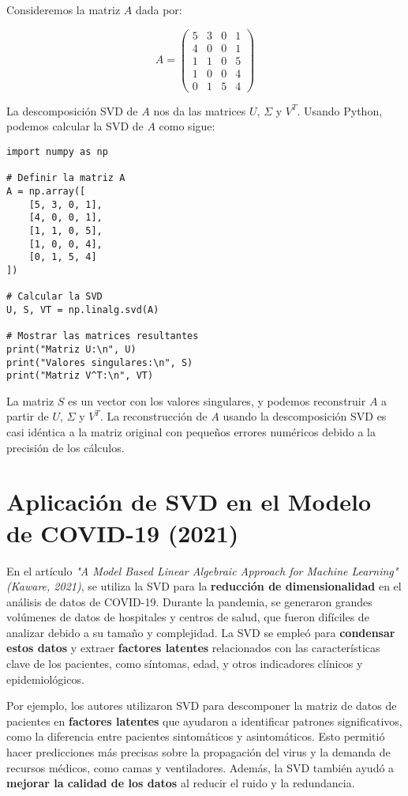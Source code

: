 \documentclass{article}
\begin{document}
Consideremos la matriz \(A\) dada por:

\[
A = \begin{pmatrix}
5 & 3 & 0 & 1 \\
4 & 0 & 0 & 1 \\
1 & 1 & 0 & 5 \\
1 & 0 & 0 & 4 \\
0 & 1 & 5 & 4
\end{pmatrix}
\]

La descomposición SVD de \(A\) nos da las matrices \(U\), \(\Sigma\) y \(V^T\). Usando Python, podemos calcular la SVD de \(A\) como sigue:

\begin{verbatim}
import numpy as np

# Definir la matriz A
A = np.array([
    [5, 3, 0, 1],
    [4, 0, 0, 1],
    [1, 1, 0, 5],
    [1, 0, 0, 4],
    [0, 1, 5, 4]
])

# Calcular la SVD
U, S, VT = np.linalg.svd(A)

# Mostrar las matrices resultantes
print("Matriz U:\n", U)
print("Valores singulares:\n", S)
print("Matriz V^T:\n", VT)
\end{verbatim}

La matriz \(S\) es un vector con los valores singulares, y podemos reconstruir \(A\) a partir de \(U\), \(\Sigma\) y \(V^T\). La reconstrucción de \(A\) usando la descomposición SVD es casi idéntica a la matriz original con pequeños errores numéricos debido a la precisión de los cálculos.

\section{Aplicación de SVD en el Modelo de COVID-19 (2021)}

En el artículo \textit{"A Model Based Linear Algebraic Approach for Machine Learning" (Kaware, 2021)}, se utiliza la SVD para la \textbf{reducción de dimensionalidad} en el análisis de datos de COVID-19. Durante la pandemia, se generaron grandes volúmenes de datos de hospitales y centros de salud, que fueron difíciles de analizar debido a su tamaño y complejidad. La SVD se empleó para \textbf{condensar estos datos} y extraer \textbf{factores latentes} relacionados con las características clave de los pacientes, como síntomas, edad, y otros indicadores clínicos y epidemiológicos.

Por ejemplo, los autores utilizaron SVD para descomponer la matriz de datos de pacientes en \textbf{factores latentes} que ayudaron a identificar patrones significativos, como la diferencia entre pacientes sintomáticos y asintomáticos. Esto permitió hacer predicciones más precisas sobre la propagación del virus y la demanda de recursos médicos, como camas y ventiladores. Además, la SVD también ayudó a \textbf{mejorar la calidad de los datos} al reducir el ruido y la redundancia.
\end{document}
